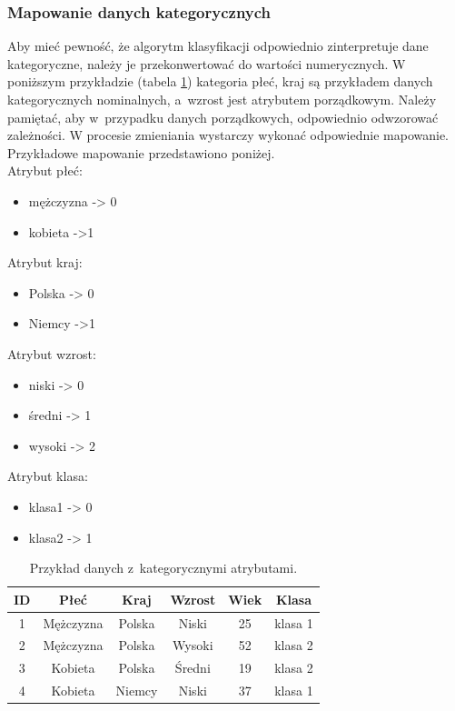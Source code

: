 \subsubsection{Mapowanie danych kategorycznych}
Aby mieć pewność, że algorytm klasyfikacji odpowiednio zinterpretuje dane kategoryczne, należy je przekonwertować do wartości numerycznych. W poniższym przykładzie (tabela \ref{danekategoryczne}) kategoria płeć, kraj są przykładem danych kategorycznych nominalnych, a~wzrost jest atrybutem porządkowym. Należy pamiętać, aby w~przypadku danych porządkowych, odpowiednio odwzorować zależności.
W procesie zmieniania wystarczy wykonać odpowiednie mapowanie. Przykładowe mapowanie przedstawiono poniżej. \\
Atrybut płeć:
\begin{itemize}
	\item mężczyzna -> 0
	\item kobieta ->1
\end{itemize}
\newpage
Atrybut kraj:
\begin{itemize}
	\item Polska -> 0
	\item Niemcy ->1
\end{itemize}
Atrybut wzrost:
\begin{itemize}
	\item niski -> 0
	\item średni -> 1
	\item wysoki -> 2
\end{itemize}
Atrybut klasa:
\begin{itemize}
	\item klasa1 -> 0
	\item klasa2 -> 1
\end{itemize}
\begin{table}[H]
	\begin{center}

			\begin{tabular}{cccccc}	
				{\bf ID} & {\bf Płeć } & {\bf Kraj} & {\bf Wzrost } & {\bf Wiek} & {\bf Klasa } \\
				\hline 
				1 & Mężczyzna & Polska & Niski & 25 & klasa 1 \\
				2 & Mężczyzna & Polska & Wysoki & 52 & klasa 2 \\
				3 & Kobieta & Polska & Średni & 19 & klasa 2 \\
				4 & Kobieta & Niemcy & Niski & 37 & klasa 1 \\
			\end{tabular}
			\caption{Przykład danych z~kategorycznymi atrybutami.}
			\label{danekategoryczne}
		\end{center}
\end{table}
